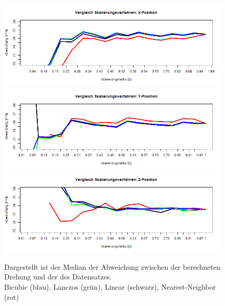 \begin{figure}
	\centering
	\includegraphics[width=\linewidth]{img_Skalierung/Skal_Diff_TX}
	\includegraphics[width=\linewidth]{img_Skalierung/Skal_Diff_TY}
	\includegraphics[width=\linewidth]{img_Skalierung/Skal_Diff_TZ}
	\caption{Dargestellt ist der Median der Abweichung zwischen der berechneten Drehung und der des Datensatzes.\\
		Bicubic (blau), Lanczos (grün), Linear (schwarz), Nearest-Neighbor (rot)}
	\label{img_Pos_Dif}
\end{figure}
